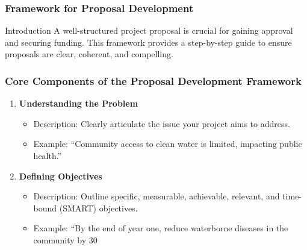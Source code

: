 \documentclass[aspectratio=169]{beamer}
\begin{document}
\begin{frame}[fragile]
    \frametitle{Framework for Proposal Development}
    \begin{block}{Introduction}
        A well-structured project proposal is crucial for gaining approval and securing funding. This framework provides a step-by-step guide to ensure proposals are clear, coherent, and compelling.
    \end{block}
\end{frame}

\begin{frame}[fragile]
    \frametitle{Core Components of the Proposal Development Framework}
    \begin{enumerate}
        \item \textbf{Understanding the Problem}
        \begin{itemize}
            \item Description: Clearly articulate the issue your project aims to address.
            \item Example: “Community access to clean water is limited, impacting public health.”
        \end{itemize}

        \item \textbf{Defining Objectives}
        \begin{itemize}
            \item Description: Outline specific, measurable, achievable, relevant, and time-bound (SMART) objectives.
            \item Example: “By the end of year one, reduce waterborne diseases in the community by 30%
        \end{itemize}
    \end{enumerate}
\end{frame}
\end{document}
